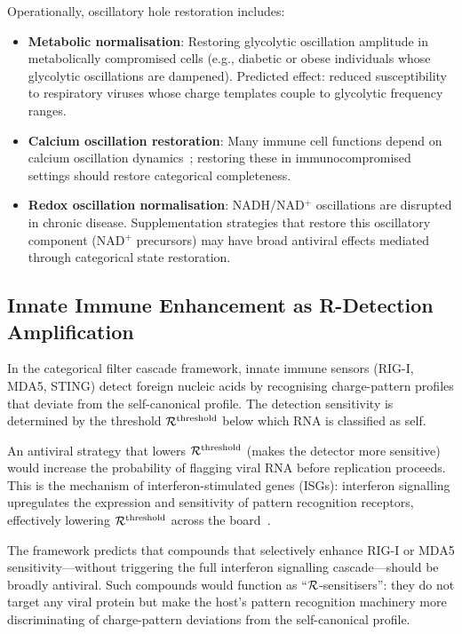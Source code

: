 Operationally, oscillatory hole restoration includes:
\begin{itemize}
  \item \textbf{Metabolic normalisation}: Restoring glycolytic oscillation amplitude in metabolically compromised cells (e.g., diabetic or obese individuals whose glycolytic oscillations are dampened). Predicted effect: reduced susceptibility to respiratory viruses whose charge templates couple to glycolytic frequency ranges.
  \item \textbf{Calcium oscillation restoration}: Many immune cell functions depend on calcium oscillation dynamics~\cite{Berridge1997}; restoring these in immunocompromised settings should restore categorical completeness.
  \item \textbf{Redox oscillation normalisation}: NADH/NAD$^+$ oscillations are disrupted in chronic disease. Supplementation strategies that restore this oscillatory component (NAD$^+$ precursors) may have broad antiviral effects mediated through categorical state restoration.
\end{itemize}

\subsection{Innate Immune Enhancement as R-Detection Amplification}

In the categorical filter cascade framework, innate immune sensors (RIG-I, MDA5, STING) detect foreign nucleic acids by recognising charge-pattern profiles that deviate from the self-canonical profile. The detection sensitivity is determined by the threshold $\mathcal{R}^{\mathrm{threshold}}$ below which RNA is classified as self.

An antiviral strategy that lowers $\mathcal{R}^{\mathrm{threshold}}$ (makes the detector more sensitive) would increase the probability of flagging viral RNA before replication proceeds. This is the mechanism of interferon-stimulated genes (ISGs): interferon signalling upregulates the expression and sensitivity of pattern recognition receptors, effectively lowering $\mathcal{R}^{\mathrm{threshold}}$ across the board~\cite{Schneider2014}.

The framework predicts that compounds that selectively enhance RIG-I or MDA5 sensitivity---without triggering the full interferon signalling cascade---should be broadly antiviral. Such compounds would function as ``$\mathcal{R}$-sensitisers'': they do not target any viral protein but make the host's pattern recognition machinery more discriminating of charge-pattern deviations from the self-canonical profile.

